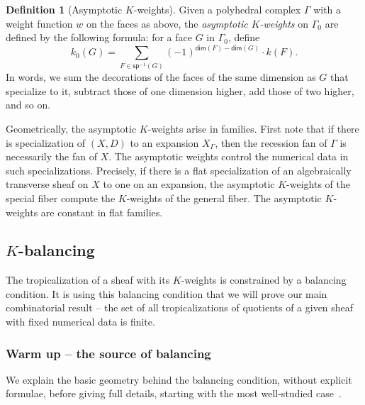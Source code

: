 \documentclass[11pt]{amsart}
\theoremstyle{definition}
\theoremstyle{definition}
\newtheorem{definition}[theorem]{Definition}
\begin{document}
\begin{definition}[Asymptotic $K$-weights]\label{def: asymptotic-weights}
Given a polyhedral complex $\Gamma$ with a weight function $w$ on the faces as above, the {\it asymptotic $K$-weights} on $\Gamma_0$ are defined by the following formula: for a face $G$ in $\Gamma_0$, define
\[
k_0(G) = \sum_{F\in \mathsf{sp}^{-1}(G)} (-1)^{\mathsf{dim}(F)-\mathsf{dim}(G)}\cdot k(F).
\]
In words, we sum the decorations of the faces of the same dimension as $G$ that specialize to it, subtract those of one dimension higher, add those of two higher, and so on. 
\end{definition}

Geometrically, the asymptotic $K$-weights arise in families. First note that if there is specialization of $(X,D)$ to an expansion $X_\Gamma$, then the recession fan of $\Gamma$ is necessarily the fan of $X$. The asymptotic weights control the numerical data in such specializations. Precisely, if there is a flat specialization of an algebraically transverse sheaf on $X$ to one on an expansion, the asymptotic $K$-weights of the special fiber compute the $K$-weights of the general fiber. The asymptotic $K$-weights are constant in flat families. 



\subsection{$K$-balancing} The tropicalization of a sheaf with its $K$-weights is constrained by a balancing condition. It is using this balancing condition that we will prove our main combinatorial result -- the set of all tropicalizations of quotients of a given sheaf with fixed numerical data is finite. 

\subsubsection{Warm up -- the source of balancing}\label{sec: ordinary-balancing} We explain the basic geometry behind the balancing condition, without explicit formulae, before giving full details, starting with the most well-studied case~\cite{IntToricVar,MaclaganSturmfels,Mi03}.
\end{document}

